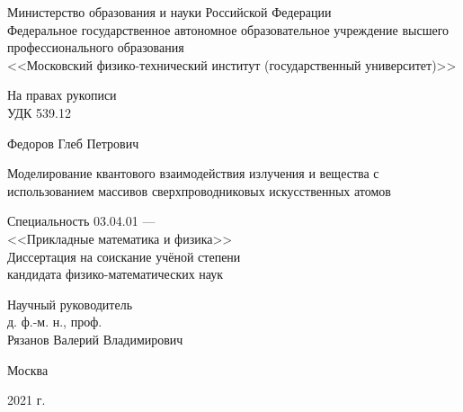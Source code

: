 \documentclass[14pt, a4paper]{extreport}
\numberwithin{equation}{section}
\begin{document}
\begin{titlepage}
\par 
\vspace*{-2cm}
\begin{center}
Министерство образования и науки Российской Федерации\\
Федеральное государственное автономное образовательное учреждение высшего\\ 
профессионального образования \\
<<Московский физико-технический институт (государственный университет)>> 
\end{center}

\vspace*{0.2cm}
\begin{flushright}
На правах рукописи\\
УДК 539.12
\end{flushright}

\vfill

\begin{center}
Федоров Глеб Петрович

\vspace*{0.5cm}

{\large Моделирование квантового взаимодействия излучения и вещества с использованием массивов сверхпроводниковых искусственных атомов}


\begin{center}
Специальность 03.04.01 ---\\ <<Прикладные математика и физика>>\\
\vspace{0.5cm}
Диссертация на соискание учёной степени \\
кандидата физико-математических наук
\end{center}


\vspace*{2cm}


\begin{flushright}
Научный руководитель\\
д. ф.-м. н., проф.\\
Рязанов Валерий Владимирович
\end{flushright}



\vfill

Москва

2021 г. 
\end {center} 
\end{titlepage}


\tableofcontents
\end{document}
